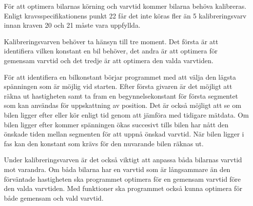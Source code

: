 För att optimera bilarnas körning och varvtid kommer bilarna behöva kalibreras.
Enligt kravsspecifikationens punkt 22 får det inte köras fler än 5
kalibreringsvarv innan kraven 20 och 21 måste vara uppfyllda.

Kalibreringsvarven behöver ta hänsyn till tre moment. Det första är att
identifiera vilken konstant en bil behöver, det andra är att optimera för
gemensam varvtid och det tredje är att optimera den valda varvtiden.

För att identifiera en bilkonstant börjar programmet med att välja den lägsta
spänningen som är möjlig vid starten. Efter första givaren är det möjligt att
räkna ut hastigheten samt ta fram en begynnelsekonstant för första segmentet
som kan användas för uppskattning av position. Det är också möjligt att se om
bilen ligger efter eller kör enligt tid genom att jämföra med tidigare mätdata.
Om bilen ligger efter kommer spänningen ökas succesivt tills bilen har nått den
önskade tiden mellan segmenten för att uppnå önskad varvtid. När bilen ligger i
fas kan den konstant som krävs för den nuvarande bilen räknas ut.

Under kalibreringsvarven är det också viktigt att anpassa båda bilarnas varvtid
mot varandra. Om båda bilarna har en varvtid som är långsammare än den
förväntade hastigheten ska programmet optimera för en gemensam varvtid före den
valda varvtiden. Med funktioner ska programmet också kunna optimera för både
gemensam och vald varvtid.

